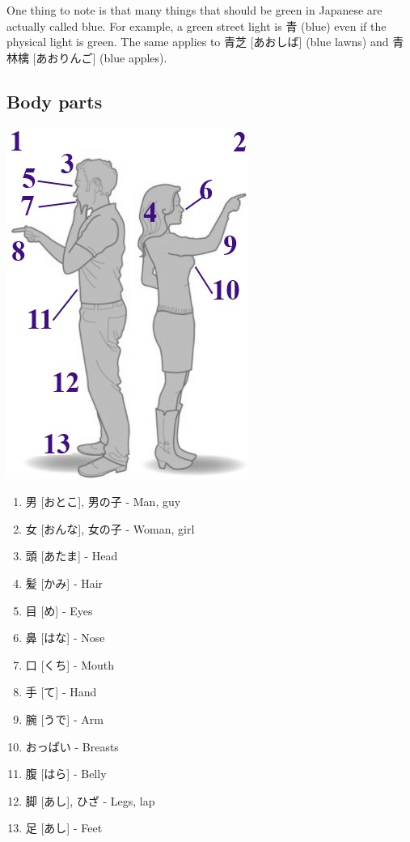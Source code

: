 \documentclass{article}
\begin{document}
\begin{CJK}{UTF8}{min}
\begin{multicols*}{3}
One thing to note is that many things that should be green in Japanese are actually called blue. For example, a green street light is 青 (blue) even if the physical light is 
green. The same applies to 青芝 [あおしば] (blue lawns) and 青林檎 [あおりんご] (blue apples).

\subsection{Body parts}

\includegraphics{bodies}

\begin{enumerate}
\item 男 [おとこ], 男の子 - Man, guy
\item 女 [おんな], 女の子 - Woman, girl
\item 頭 [あたま] - Head
\item 髪 [かみ] - Hair
\item 目 [め] - Eyes
\item 鼻 [はな] - Nose
\item 口 [くち] - Mouth
\item 手 [て] - Hand
\item 腕 [うで] - Arm
\item おっぱい - Breasts
\item 腹 [はら] - Belly
\item 脚 [あし], ひざ - Legs, lap
\item 足 [あし] - Feet
\end{enumerate}


\end{multicols*}
\end{CJK}
\end{document}
